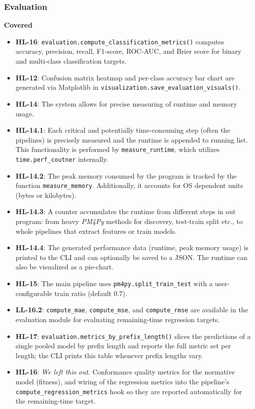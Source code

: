 \documentclass[12pt,a4paper]{article}
\begin{document}
\subsubsection{Evaluation}

\textbf{Covered}
\begin{itemize}
    \item \textbf{HL-16}: \texttt{evaluation.compute\_classification\_metrics()} computes accuracy, precision, recall, F1-score, ROC-AUC, and Brier score for binary and multi-class classification targets.
    \item \textbf{HL-12}: Confusion matrix heatmap and per-class accuracy bar chart are generated via Matplotlib in \texttt{visualization.save\_evaluation\_visuals()}.
    \item \textbf{HL-14}: The system allows for precise measuring of runtime and memory usage.
    \item \textbf{HL-14.1}: Each critical and potentially time-consuming step (often the pipelines) is precisely measured and the runtime is appended to running list. This functionality is performed by \texttt{measure\_runtime}, which utilizes \texttt{time.perf\_coutner} internally.
    \item \textbf{HL-14.2}: The peak memory consumed by the program is tracked by the function \texttt{measure\_memory}. Additionally, it accounts for OS dependent units (bytes or kilobytes).
    \item \textbf{HL-14.3}: A counter accumulates the runtime from different steps in out program: from heavy \textit{PM4Py} methods for discovery, test-train split etc., to whole pipelines that extract features or train models.
    \item \textbf{HL-14.4}: The generated performance data (runtime, peak memory usage) is printed to the CLI and can optionally be saved to a JSON. The runtime can also be visualized as a pie-chart.
    \item \textbf{HL-15}: The main pipeline uses \texttt{pm4py.split\_train\_test} with a user-configurable train ratio (default $0.7$).
    \item \textbf{LL-16.2}: \texttt{compute\_mae}, \texttt{compute\_mse}, and \texttt{compute\_rmse} are available in the evaluation module for evaluating remaining-time regression targets.
    \item \textbf{HL-17}: \texttt{evaluation.metrics\_by\_prefix\_length()} slices the predictions of a single pooled model by prefix length and reports the full metric set per length; the CLI prints this table whenever prefix lengths vary.
    \item \textbf{HL-16}: \textit{We left this out. } Conformance quality metrics for the normative model (fitness), and wiring of the regression metrics into the pipeline's \texttt{compute\_regression\_metrics} hook so they are reported automatically for the remaining-time target.
\end{itemize}
\end{document}
